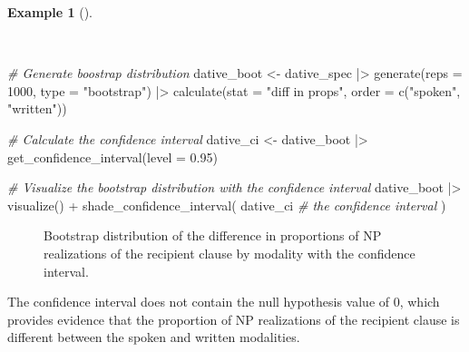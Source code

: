 \documentclass[
  letterpaper,
  DIV=11,
  numbers=noendperiod]{scrreprt}
\newenvironment{Shaded}{\begin{snugshade}}{\end{snugshade}}
\newcommand{\AttributeTok}[1]{\textcolor[rgb]{0.00,0.00,0.00}{#1}}
\newcommand{\CommentTok}[1]{\textcolor[rgb]{0.00,0.00,0.00}{\textit{#1}}}
\newcommand{\DecValTok}[1]{\textcolor[rgb]{0.00,0.00,0.00}{#1}}
\newcommand{\FloatTok}[1]{\textcolor[rgb]{0.00,0.00,0.00}{#1}}
\newcommand{\FunctionTok}[1]{\textcolor[rgb]{0.00,0.00,0.00}{#1}}
\newcommand{\NormalTok}[1]{\textcolor[rgb]{0.00,0.00,0.00}{#1}}
\newcommand{\OtherTok}[1]{\textcolor[rgb]{0.00,0.00,0.00}{#1}}
\newcommand{\SpecialCharTok}[1]{\textcolor[rgb]{0.00,0.00,0.00}{#1}}
\newcommand{\StringTok}[1]{\textcolor[rgb]{0.00,0.00,0.00}{#1}}
\theoremstyle{definition}
\newtheorem{example}{Example}[chapter]
\theoremstyle{remark}
\begin{document}
\begin{example}[]\protect\hypertarget{exm-ida-cat-confidence-interval-bivariate}{}\label{exm-ida-cat-confidence-interval-bivariate}

~

\begin{Shaded}
\begin{Highlighting}[]
\CommentTok{\# Generate boostrap distribution}
\NormalTok{dative\_boot }\OtherTok{\textless{}{-}}
\NormalTok{  dative\_spec }\SpecialCharTok{|\textgreater{}}
  \FunctionTok{generate}\NormalTok{(}\AttributeTok{reps =} \DecValTok{1000}\NormalTok{, }\AttributeTok{type =} \StringTok{"bootstrap"}\NormalTok{) }\SpecialCharTok{|\textgreater{}}
  \FunctionTok{calculate}\NormalTok{(}\AttributeTok{stat =} \StringTok{"diff in props"}\NormalTok{, }\AttributeTok{order =} \FunctionTok{c}\NormalTok{(}\StringTok{"spoken"}\NormalTok{, }\StringTok{"written"}\NormalTok{))}

\CommentTok{\# Calculate the confidence interval}
\NormalTok{dative\_ci }\OtherTok{\textless{}{-}}
\NormalTok{  dative\_boot }\SpecialCharTok{|\textgreater{}}
  \FunctionTok{get\_confidence\_interval}\NormalTok{(}\AttributeTok{level =} \FloatTok{0.95}\NormalTok{)}

\CommentTok{\# Visualize the bootstrap distribution with the confidence interval}
\NormalTok{dative\_boot }\SpecialCharTok{|\textgreater{}}
  \FunctionTok{visualize}\NormalTok{() }\SpecialCharTok{+}
  \FunctionTok{shade\_confidence\_interval}\NormalTok{(}
\NormalTok{    dative\_ci }\CommentTok{\# the confidence interval}
\NormalTok{  )}
\end{Highlighting}
\end{Shaded}

\begin{figure}[H]


\caption{\label{fig-ida-cat-confidence-interval-bivariate}Bootstrap
distribution of the difference in proportions of NP realizations of the
recipient clause by modality with the confidence interval.}

\end{figure}%

\end{example}

The confidence interval does not contain the null hypothesis value of 0,
which provides evidence that the proportion of NP realizations of the
recipient clause is different between the spoken and written modalities.
\end{document}
